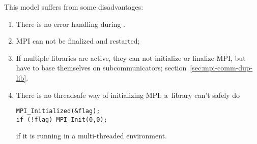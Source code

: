 This model suffers from some disadvantages:
\begin{enumerate}
\item There is no error handling during .
\item MPI can not be finalized and restarted;
\item If multiple libraries are active, they can not initialize
  or finalize MPI, but have to base themselves on subcommunicators;
  section~\ref{sec:mpi-comm-dup-lib}.
\item There is no threadsafe way of initializing MPI:
  a~library can't safely do
\begin{lstlisting}
MPI_Initialized(&flag);
if (!flag) MPI_Init(0,0);
\end{lstlisting}
if it is running in a multi-threaded environment.
\end{enumerate}

